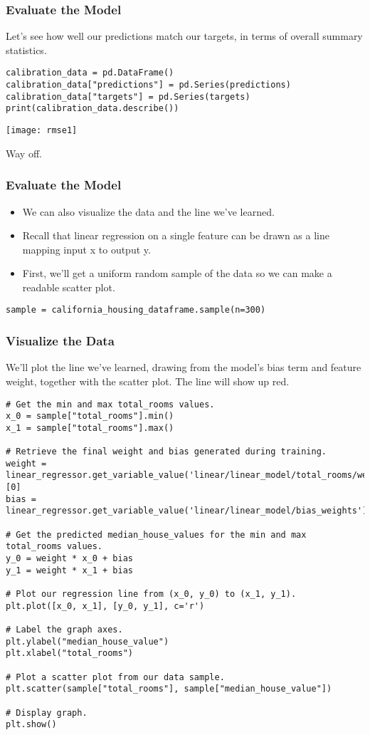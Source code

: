 \begin{frame}[fragile]\frametitle{Evaluate the Model}
Let's see how well our predictions match our targets, in terms of overall summary statistics.
\begin{lstlisting}
calibration_data = pd.DataFrame()
calibration_data["predictions"] = pd.Series(predictions)
calibration_data["targets"] = pd.Series(targets)
print(calibration_data.describe())
\end{lstlisting}

\begin{center}
\texttt{[image: rmse1]}
\end{center}
Way off.
\end{frame}

\begin{frame}[fragile]\frametitle{Evaluate the Model}
\begin{itemize}
\item We can also visualize the data and the line we've learned. 
\item Recall that linear regression on a single feature can be drawn as a line mapping input x to output y.
\item First, we'll get a uniform random sample of the data so we can make a readable scatter plot.
\end{itemize}

\begin{lstlisting}
sample = california_housing_dataframe.sample(n=300)
\end{lstlisting}
\end{frame}


\begin{frame}[fragile]\frametitle{Visualize the Data}
We'll plot the line we've learned, drawing from the model's bias term and feature weight, together with the scatter plot. The line will show up red.
\begin{lstlisting}
# Get the min and max total_rooms values.
x_0 = sample["total_rooms"].min()
x_1 = sample["total_rooms"].max()

# Retrieve the final weight and bias generated during training.
weight = linear_regressor.get_variable_value('linear/linear_model/total_rooms/weights')[0]
bias = linear_regressor.get_variable_value('linear/linear_model/bias_weights')

# Get the predicted median_house_values for the min and max total_rooms values.
y_0 = weight * x_0 + bias 
y_1 = weight * x_1 + bias

# Plot our regression line from (x_0, y_0) to (x_1, y_1).
plt.plot([x_0, x_1], [y_0, y_1], c='r')

# Label the graph axes.
plt.ylabel("median_house_value")
plt.xlabel("total_rooms")

# Plot a scatter plot from our data sample.
plt.scatter(sample["total_rooms"], sample["median_house_value"])

# Display graph.
plt.show()
\end{lstlisting}
\end{frame}

